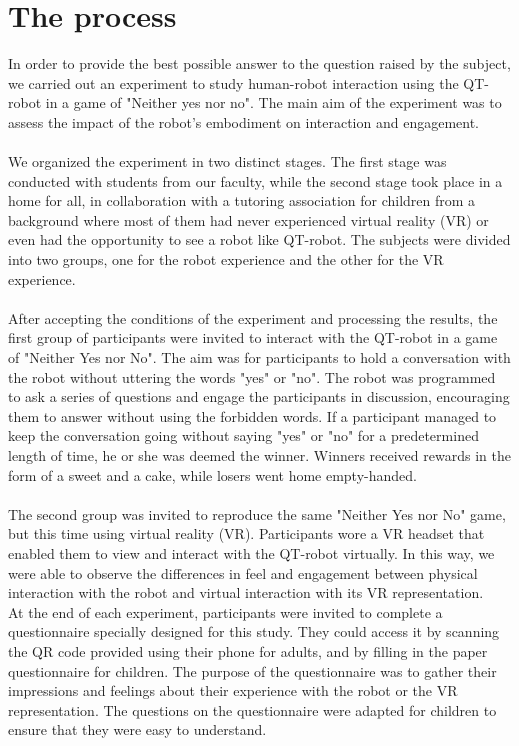 \section{The process}
\hspace{\parindent} In order to provide the best possible answer to the question raised by the subject, we carried out an experiment to study human-robot interaction using the QT-robot in a game of "Neither yes nor no". The main aim of the experiment was to assess the impact of the robot's embodiment on interaction and engagement.\\
\\
We organized the experiment in two distinct stages. The first stage was conducted with students from our faculty, while the second stage took place in a home for all, in collaboration with a tutoring association for children from a background where most of them had never experienced virtual reality (VR) or even had the opportunity to see a robot like QT-robot. The subjects were divided into two groups, one for the robot experience and the other for the VR experience.\\
\\
After accepting the conditions of the experiment and processing the results, the first group of participants were invited to interact with the QT-robot in a game of "Neither Yes nor No". The aim was for participants to hold a conversation with the robot without uttering the words "yes" or "no". The robot was programmed to ask a series of questions and engage the participants in discussion, encouraging them to answer without using the forbidden words. If a participant managed to keep the conversation going without saying "yes" or "no" for a predetermined length of time, he or she was deemed the winner. Winners received rewards in the form of a sweet and a cake, while losers went home empty-handed.\\
\\
The second group was invited to reproduce the same "Neither Yes nor No" game, but this time using virtual reality (VR). Participants wore a VR headset that enabled them to view and interact with the QT-robot virtually. In this way, we were able to observe the differences in feel and engagement between physical interaction with the robot and virtual interaction with its VR representation.
\\
At the end of each experiment, participants were invited to complete a questionnaire specially designed for this study. They could access it by scanning the QR code provided using their phone for adults, and by filling in the paper questionnaire for children. The purpose of the questionnaire was to gather their impressions and feelings about their experience with the robot or the VR representation. The questions on the questionnaire were adapted for children to ensure that they were easy to understand.\\
